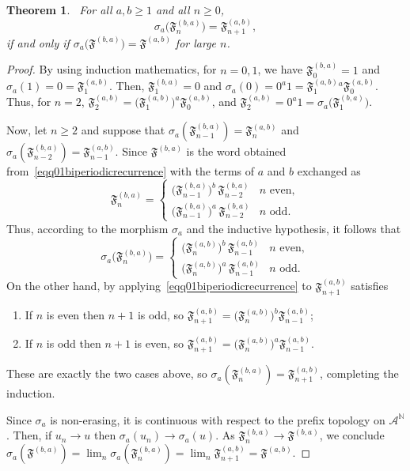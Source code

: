 \documentclass[10pt,a4paper]{amsart}
\newtheorem{theorem}{Theorem}
\newcommand{\AlphA}{\mathcal{A}}
\newcommand{\FD}{\mathfrak{F}}
\newcommand{\N}{\mathbb{N}}
\begin{document}
\begin{theorem}~\label{thm01desub}
For all $a,b\geqslant 1$ and all $n\geqslant 0$,
\[
  \sigma_a\bigl(\FD^{(b,a)}_n\bigr) = \FD^{(a,b)}_{n+1},
\]
if and only if  $\sigma_a\bigl(\FD^{(b,a)}\bigr) = \FD^{(a,b)}$ for large $n$.
\end{theorem}

\begin{proof}
By using induction mathematics, for $n=0,1$, we have $\FD^{(b,a)}_0=1$ and $\sigma_a(1)=0=\FD^{(a,b)}_1$. Then, $\FD^{(b,a)}_1=0$ and $\sigma_a(0)=0^a1=\FD^{(a,b)}_1{}^{a}\FD^{(a,b)}_0$. Thus, for $n=2$, $\FD^{(a,b)}_2=\bigl(\FD^{(a,b)}_1\bigr)^a \FD^{(a,b)}_0$, and $\FD^{(a,b)}_2=0^a1=\sigma_a\bigl(\FD^{(b,a)}_1\bigr)$.

Now, let $n\geqslant 2$ and suppose that $\sigma_a(\FD^{(b,a)}_{n-1})=\FD^{(a,b)}_n$ and $\sigma_a(\FD^{(b,a)}_{n-2})=\FD^{(a,b)}_{n-1}$. Since $\FD^{(b,a)}$ is the word obtained from~\eqref{eqq01biperiodicrecurrence} with the terms of $a$ and $b$ exchanged as
\[
  \FD^{(b,a)}_n =
  \begin{cases}
    \bigl(\FD^{(b,a)}_{n-1}\bigr)^{b}\, \FD^{(b,a)}_{n-2} & n \text{ even},\\[2pt]
    \bigl(\FD^{(b,a)}_{n-1}\bigr)^{a}\, \FD^{(b,a)}_{n-2} & n \text{ odd}.
  \end{cases}
\]
Thus, according to the morphism $\sigma_a$  and the inductive hypothesis, it follows that 
\[
  \sigma_a\bigl(\FD^{(b,a)}_n\bigr) =
  \begin{cases}
    \bigl(\FD^{(a,b)}_{n}\bigr)^{b}\, \FD^{(a,b)}_{n-1} & n \text{ even},\\[2pt]
    \bigl(\FD^{(a,b)}_{n}\bigr)^{a}\, \FD^{(a,b)}_{n-1} & n \text{ odd}.
  \end{cases}
\]
On the other hand, by applying~\eqref{eqq01biperiodicrecurrence} to
$\FD^{(a,b)}_{n+1}$ satisfies
\begin{enumerate}
    \item If $n$ is even then $n+1$ is odd, so $\FD^{(a,b)}_{n+1}=\bigl(\FD^{(a,b)}_n\bigr)^b \FD^{(a,b)}_{n-1}$;
    \item If $n$ is odd then $n+1$ is even, so $\FD^{(a,b)}_{n+1}=\bigl(\FD^{(a,b)}_n\bigr)^a
\FD^{(a,b)}_{n-1}$.
\end{enumerate}
 These are exactly the two cases above, so $\sigma_a(\FD^{(b,a)}_n)=\FD^{(a,b)}_{n+1}$, completing the induction.

Since $\sigma_a$ is non-erasing, it is continuous with respect to the prefix topology on $\AlphA ^{\N}$. Then, if $u_n\to u$ then $\sigma_a(u_n)\to\sigma_a(u)$. As $\FD^{(b,a)}_n\to
\FD^{(b,a)}$, we conclude $\sigma_a(\FD^{(b,a)})=\lim_n
\sigma_a(\FD^{(b,a)}_n)=\lim_n \FD^{(a,b)}_{n+1}=\FD^{(a,b)}$.
\end{proof}
\end{document}

